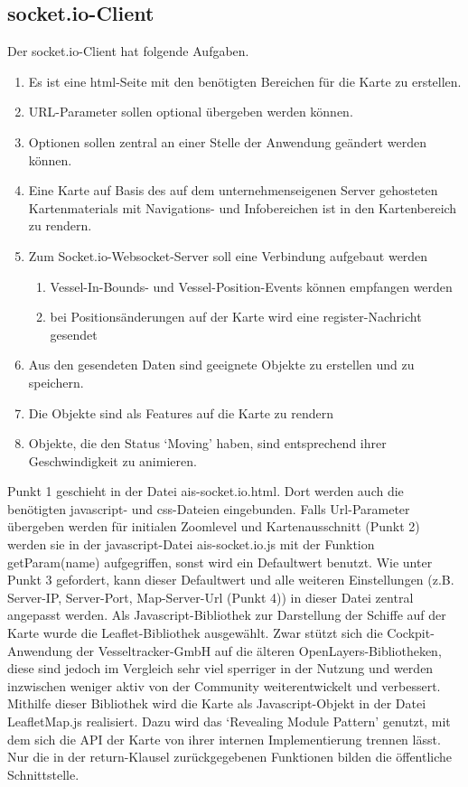 \subsection{socket.io-Client}\label{socket.io-Client}
Der socket.io-Client hat folgende Aufgaben.
\begin{enumerate}
\item Es ist eine html-Seite mit den benötigten Bereichen für die Karte zu erstellen.
\item URL-Parameter sollen optional übergeben werden können.
\item Optionen sollen zentral an einer Stelle der Anwendung geändert werden können.
\item Eine Karte auf Basis des auf dem unternehmenseigenen Server gehosteten Kartenmaterials mit Navigations- und Infobereichen ist in den Kartenbereich zu rendern.
\item Zum Socket.io-Websocket-Server soll eine Verbindung aufgebaut werden
\begin{enumerate}
\item Vessel-In-Bounds- und Vessel-Position-Events können empfangen werden
\item bei Positionsänderungen auf der Karte wird eine register-Nachricht gesendet
\end{enumerate}
\item Aus den gesendeten Daten sind geeignete Objekte zu erstellen und zu speichern.
\item Die Objekte sind als Features auf die Karte zu rendern
\item Objekte, die den Status ‘Moving’ haben, sind entsprechend ihrer Geschwindigkeit zu animieren.
\end{enumerate}
Punkt 1 geschieht in der Datei ais-socket.io.html. Dort werden auch die benötigten javascript- und css-Dateien eingebunden. Falls Url-Parameter übergeben werden für initialen Zoomlevel und Kartenausschnitt (Punkt 2) werden sie in der javascript-Datei ais-socket.io.js mit der Funktion getParam(name) aufgegriffen, sonst wird ein Defaultwert benutzt. Wie unter Punkt 3 gefordert, kann dieser Defaultwert und alle weiteren Einstellungen (z.B. Server-IP, Server-Port, Map-Server-Url (Punkt 4)) in dieser Datei zentral angepasst werden.
Als Javascript-Bibliothek zur Darstellung der Schiffe auf der Karte wurde die Leaflet-Bibliothek ausgewählt. Zwar stützt sich die Cockpit-Anwendung der Vesseltracker-GmbH auf die älteren OpenLayers-Bibliotheken, diese sind jedoch im Vergleich sehr viel sperriger in der Nutzung und werden inzwischen weniger aktiv von der Community weiterentwickelt und verbessert.
Mithilfe dieser Bibliothek wird die Karte als Javascript-Objekt in der Datei LeafletMap.js realisiert. Dazu wird das ‘Revealing Module Pattern’ genutzt, mit dem sich die API der Karte von ihrer internen Implementierung trennen lässt. Nur die in der return-Klausel zurückgegebenen Funktionen bilden die öffentliche Schnittstelle.

